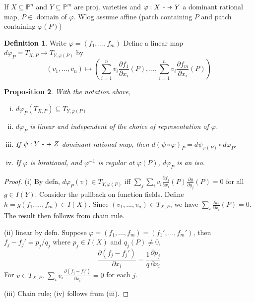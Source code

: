 \documentclass{article}
\theoremstyle{definition}
\newtheorem{defn}{Definition}[section]
\theoremstyle{remark}
\theoremstyle{plain}
\newtheorem{prop}[defn]{Proposition}
\newcommand{\PP}{\mathbb{P}}
\newcommand\dashto{\mathrel{
  -\mkern-6mu{\to}\mkern-20mu{\color{white}\bullet}\mkern12mu
}}
\begin{document}
If $X\subseteq \PP^n$ and $Y\subseteq \PP^m$ are proj. varieties and $\varphi:X\dashto Y$ a dominant rational map, $P\in$ domain of $\varphi$. Wlog assume affine (patch containing $P$ and patch containing $\varphi(P)$)
\begin{defn}
    Write $\varphi=(f_1,...,f_m)$
    Define a linear map $d\varphi_P=T_{X,P}\to T_{Y,\varphi(P)}$ by
    \[(v_1,...,v_n)\mapsto \left(\sum_{i=1}^nv_i\frac{\partial f_1}{\partial x_i}(P),...,\sum_{i=1}^nv_i\frac{\partial f_m}{\partial x_i}(P)\right)\]
\end{defn}
 \begin{prop}
     With the notation above, 
     \begin{enumerate}[(i)]
         \item $d\varphi_P(T_{X,P})\subseteq T_{Y,\varphi(P)}$
         \item $d\varphi_P$ is linear and independent of the choice of representation of $\varphi$.
         \item If $\psi:Y\dashto Z$ dominant rational map, then $d(\psi\circ\varphi)_P=d\psi_{\varphi(P)}\circ d\varphi_P$.
         \item If $\varphi$ is birational, and $\varphi^{-1}$ is regular at $\varphi(P)$, $d\varphi_P$ is an iso.
     \end{enumerate}
 \end{prop}
 \begin{proof}
     (i) By defn, $d\varphi_P(v)\in T_{Y,\varphi(P)}$ iff $\sum_j\sum_iv_i\frac{\partial f_j}{\partial x_i}(P)\frac{\partial g}{\partial y_j}(P)=0$ for all $g\in I(Y)$. Consider the pullback on function fields. Define $h=g(f_1,...,f_m)\in I(X)$. Since $(v_1,...,v_n)\in T_{X,P}$, we have $\sum_{i}\frac{\partial h}{\partial x_i}(P)=0$. The result then follows from chain rule.

     (ii) linear by defn. Suppose $\varphi=(f_1,...,f_m)=(f_1',...,f_m')$, then $f_j-f_j'=p_j/q_j$ where $p_j\in I(X)$ and $q_j(P)\neq 0$, \[\frac{\partial (f_j-f_j')}{\partial x_i}=\frac{1}{q}\frac{\partial p_j}{\partial x_i}\]
    For $v\in T_{X,P}$, $\sum_iv_i\frac{\partial(f_j-f_j')}{\partial x_i}=0$ for each $j$.

    (iii) Chain rule;
    (iv) follows from (iii).
 \end{proof}
\end{document}
